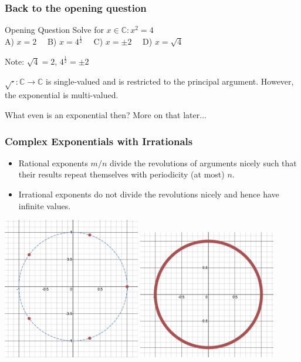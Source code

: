 \documentclass{beamer}
\begin{document}
\begin{frame}
  \frametitle{Back to the opening question}
  \begin{block}{Opening Question}
Solve for $x \in \mathbb{C}: x^2 = 4$\\
A) $x = 2\quad$ \alert{B) $x = 4^{\frac{1}{2}}\quad$ C) $x = \pm 2\quad$} D) $x= \sqrt{4}$
\end{block}
\pause
Note: $\sqrt{4} = 2$, $4^\frac{1}{2} = \pm 2$

\pause
$\sqrt{\cdot}: \mathbb{C} \rightarrow \mathbb{C}$ is single-valued and is restricted to the principal argument. However, the exponential is multi-valued.

\pause
What even is an exponential then? More on that later...
\end{frame}

\begin{frame}
  \frametitle{Complex Exponentials with Irrationals}
  \begin{itemize}
    \item<1-> Rational exponents $m/n$ divide the revolutions of arguments nicely such that their results repeat themselves with periodicity (at most) $n$.
    \item<2-> Irrational exponents do not divide the revolutions nicely and hence have infinite values.
  \end{itemize}
  \pause\pause
  \begin{center}
  \begin{minipage}{0.8\textwidth}
    \includegraphics[width=0.45\textwidth]{fifth_roots.png}
    \includegraphics[width=0.45\textwidth]{irrational_roots.png}
  \end{minipage}
  \end{center}
\end{frame}
\end{document}
